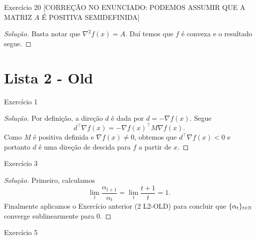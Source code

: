 \documentclass[12pt,twoside,a4paper]{article}
\begin{document}
\begin{problema}
Exercício 20 [CORREÇÃO NO ENUNCIADO: PODEMOS ASSUMIR QUE A MATRIZ \(A\) É
POSITIVA SEMIDEFINIDA]  
\end{problema}
\begin{proof}[Solução]
  Basta notar que \(\nabla^2 f(x)=A\). Daí temos que \(f\) é convexa e o
  resultado segue.
\end{proof}

\section{Lista 2 - Old}
\begin{problema}
 Exercício 1
\end{problema}
\begin{proof}[Solução]
  Por definição, a direção \(d\) é dada por \(d=-\nabla f(x)\). Segue
  \[d^\top\nabla f(x)=-\nabla f(x)^\top M\nabla f(x).\]
  Como \(M\) é positiva definida e \(\nabla f(x)\not =0\), obtemos que
  \(d^\top\nabla f(x)<0\) e portanto \(d\) é uma direção de descida para \(f\)
  a partir de \(x\).
\end{proof}
\begin{problema}
Exercício 3
\end{problema}
\begin{proof}[Solução]
  Primeiro, calculamos
  \[\lim_{t}\frac{\alpha_{t+1}}{\alpha_t}=\lim_{t}\frac{t+1}{t} =1.\]
  Finalmente aplicamos o Exercício anterior (2 L2-OLD) para concluir que
  \(\{\alpha_t\}_{t\in\mathbb{N}}\) converge sublinearmente para \(0\).
\end{proof}
\begin{problema}
Exercício 5  
\end{problema}
\end{document}
